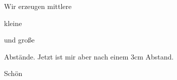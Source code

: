 \documentclass[parskip]{scrartcl}
\begin{document}
Wir erzeugen mittlere
\par\medskip 
kleine 
\par\smallskip 
und große 
\par\bigskip Abstände.
Jetzt ist mir aber nach einem 3cm Abstand. \par\vspace{3cm}
Schön
\end{document}
